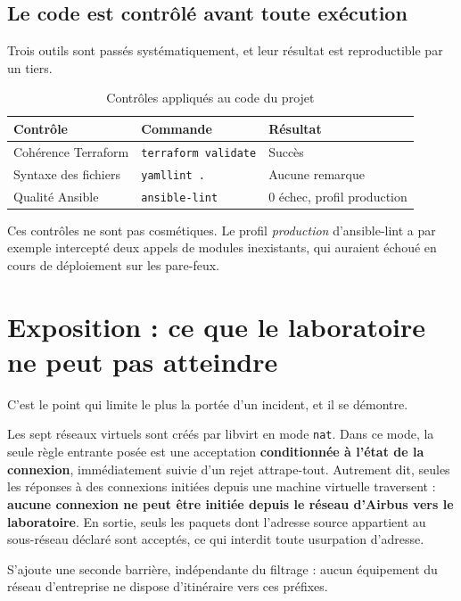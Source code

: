 \documentclass[11pt,a4paper]{article}
\newcommand{\ttb}[1]{\texttt{\small #1}}
\begin{document}
\subsection*{Le code est contrôlé avant toute exécution}

Trois outils sont passés systématiquement, et leur résultat est reproductible par
un tiers.

\begin{table}[H]
\centering
\caption{Contrôles appliqués au code du projet}
\begin{tabularx}{\textwidth}{@{}L{4.6cm}L{5.2cm}Y@{}}
\toprule
\textbf{Contrôle} & \textbf{Commande} & \textbf{Résultat} \\
\midrule
Cohérence Terraform & \ttb{terraform validate} & Succès \\
Syntaxe des fichiers & \ttb{yamllint .} & Aucune remarque \\
Qualité Ansible & \ttb{ansible-lint} & 0 échec, profil production \\
\bottomrule
\end{tabularx}
\end{table}

Ces contrôles ne sont pas cosmétiques. Le profil \emph{production} d'ansible-lint
a par exemple intercepté deux appels de modules inexistants, qui auraient échoué
en cours de déploiement sur les pare-feux.

\section{Exposition : ce que le laboratoire ne peut pas atteindre}

C'est le point qui limite le plus la portée d'un incident, et il se démontre.

Les sept réseaux virtuels sont créés par libvirt en mode \ttb{nat}. Dans ce mode,
la seule règle entrante posée est une acceptation \textbf{conditionnée à l'état de
la connexion}, immédiatement suivie d'un rejet attrape-tout. Autrement dit, seules
les réponses à des connexions initiées depuis une machine virtuelle traversent :
\textbf{aucune connexion ne peut être initiée depuis le réseau d'Airbus vers le
laboratoire}. En sortie, seuls les paquets dont l'adresse source appartient au
sous-réseau déclaré sont acceptés, ce qui interdit toute usurpation d'adresse.

S'ajoute une seconde barrière, indépendante du filtrage : aucun équipement du
réseau d'entreprise ne dispose d'itinéraire vers ces préfixes.
\end{document}
